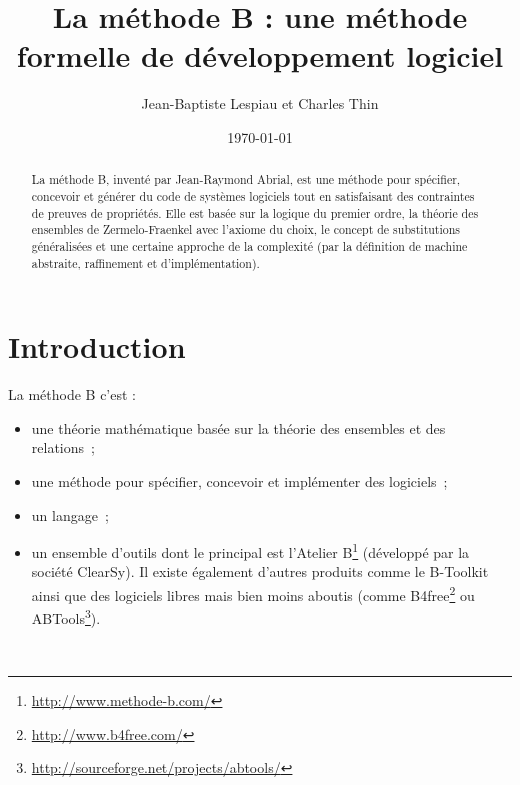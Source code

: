 \documentclass[10pt,a4paper]{article}
\author{Jean-Baptiste Lespiau et Charles Thin}
\title{La méthode B : une méthode formelle de développement logiciel}
\date\today
\begin{document}
\maketitle

\begingroup
\hypersetup{hidelinks}
\tableofcontents
\endgroup


\newpage

\begin{abstract}
La méthode B, inventé par Jean-Raymond Abrial, est une méthode pour spécifier, concevoir et générer du code de systèmes logiciels tout en satisfaisant des contraintes de preuves de propriétés.
Elle est basée sur la logique du premier ordre, la théorie des ensembles de Zermelo-Fraenkel avec l'axiome du choix, le concept de substitutions généralisées et une certaine approche de la complexité (par la définition de machine abstraite, raffinement et d'implémentation).
\end{abstract}

\section{Introduction}

La méthode B c'est :
\begin{itemize}
\item une théorie mathématique basée sur la théorie des ensembles et des relations~;
\item une méthode pour spécifier, concevoir et implémenter des logiciels~;
\item un langage~;
\item un ensemble d'outils dont le principal est l'Atelier B\footnote{\url{http://www.methode-b.com/}} (développé par la société ClearSy). Il existe également d'autres produits comme le B-Toolkit ainsi que des logiciels libres mais bien moins aboutis (comme B4free\footnote{\url{http://www.b4free.com/}} ou ABTools\footnote{\url{http://sourceforge.net/projects/abtools/}}).
\end{itemize}
~
\end{document}
